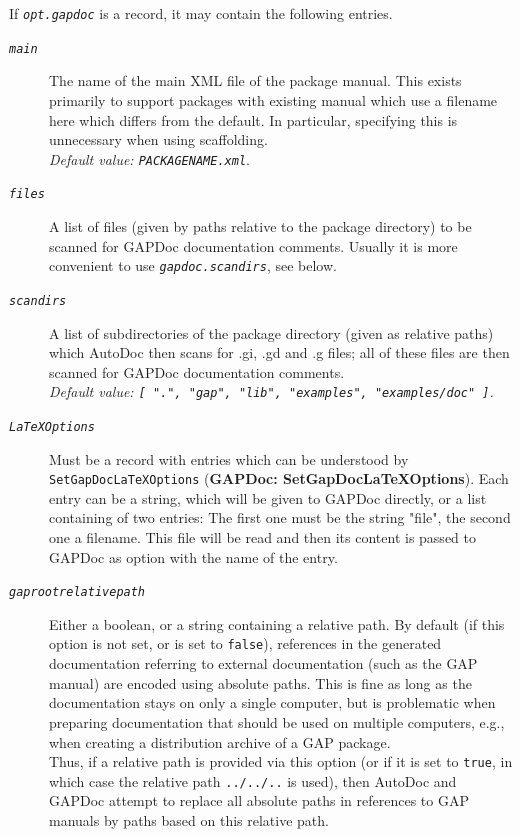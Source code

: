 \documentclass[a4paper,11pt]{report}
\begin{document}
{{{\begin{description}
\begin{description}
 

 If \mbox{\texttt{\mdseries\slshape opt.gapdoc}} is a record, it may contain the following entries. 

 
\begin{description}
\item[{\mbox{\texttt{\mdseries\slshape main}}}]  The name of the main XML file of the package manual. This exists primarily to
support packages with existing manual which use a filename here which differs
from the default. In particular, specifying this is unnecessary when using
scaffolding. \\
 \emph{Default value: \texttt{PACKAGENAME.xml}}. 
\item[{\mbox{\texttt{\mdseries\slshape files}}}]  A list of files (given by paths relative to the package directory) to be
scanned for \textsf{GAPDoc} documentation comments. Usually it is more convenient to use \mbox{\texttt{\mdseries\slshape gapdoc.scan{\textunderscore}dirs}}, see below. 
\item[{\mbox{\texttt{\mdseries\slshape scan{\textunderscore}dirs}}}]  A list of subdirectories of the package directory (given as relative paths)
which \textsf{AutoDoc} then scans for .gi, .gd and .g files; all of these files are then scanned for \textsf{GAPDoc} documentation comments. \\
 \emph{Default value: \texttt{[ ".", "gap", "lib", "examples", "examples/doc" ]}.} 
\item[{\mbox{\texttt{\mdseries\slshape LaTeXOptions}}}]  Must be a record with entries which can be understood by \texttt{SetGapDocLaTeXOptions} (\textbf{GAPDoc: SetGapDocLaTeXOptions}). Each entry can be a string, which will be given to \textsf{GAPDoc} directly, or a list containing of two entries: The first one must be the
string "file", the second one a filename. This file will be read and then its
content is passed to \textsf{GAPDoc} as option with the name of the entry. 
\item[{\mbox{\texttt{\mdseries\slshape gap{\textunderscore}root{\textunderscore}relative{\textunderscore}path}}}]  Either a boolean, or a string containing a relative path. By default (if this
option is not set, or is set to \texttt{false}), references in the generated documentation referring to external
documentation (such as the \textsf{GAP} manual) are encoded using absolute paths. This is fine as long as the
documentation stays on only a single computer, but is problematic when
preparing documentation that should be used on multiple computers, e.g., when
creating a distribution archive of a \textsf{GAP} package.\\
 Thus, if a relative path is provided via this option (or if it is set to \texttt{true}, in which case the relative path \texttt{../../..} is used), then \textsf{AutoDoc} and \textsf{GAPDoc} attempt to replace all absolute paths in references to \textsf{GAP} manuals by paths based on this relative path.


\end{description}
\end{description}
\end{description}}}}
\end{document}
